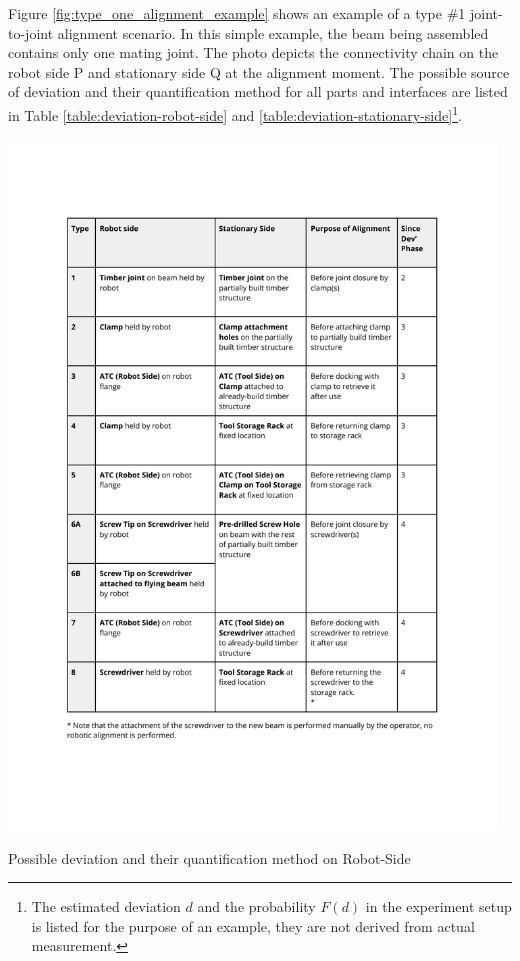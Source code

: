 Figure \ref{fig:type_one_alignment_example} shows an example of a type \#1 joint-to-joint alignment scenario. In this simple example, the beam being assembled contains only one mating joint. The photo depicts the connectivity chain on the robot side P and stationary side Q at the alignment moment. The possible source of deviation and their quantification method for all parts and interfaces are listed in Table \ref{table:deviation-robot-side} and \ref{table:deviation-stationary-side}\footnote{The estimated deviation $d$ and the probability $F(d)$ in the experiment setup is listed for the purpose of an example, they are not derived from actual measurement.}.

\FloatBarrier

\begin{table}[t]
    \includegraphics[page=3, trim=25.4mm 30mm 25.4mm 33mm, clip, width=0.97\textwidth]{tables/Tables in Chapter 9 to 11.pdf}
    \caption{Possible deviation and their quantification method on Robot-Side}
    \label{table:deviation-robot-side}
\end{table}

